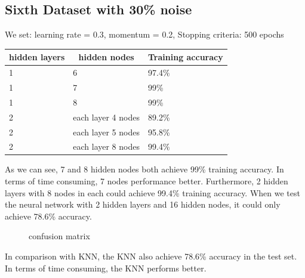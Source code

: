 \documentclass[11pt, a4paper, oneside, openright]{article}
\begin{document}
\subsection{Sixth Dataset with 30\% noise}
We set:  learning rate = 0.3, momentum = 0.2, Stopping criteria: 500 epochs
\begin{table}[H]
\begin{tabular}{|l|l|l|}
\hline
\multicolumn{1}{|c|}{\textbf{hidden layers}} & \multicolumn{1}{c|}{\textbf{hidden nodes}} 
& \multicolumn{1}{c|}{\textbf{Training accuracy}}\\
\hline
1     &6 &97.4\%                                    \\
\hline
1    &7 &99\%                                  \\
\hline
1   &8 &99\%                                             \\
\hline
2 &each layer 4 nodes  &89.2\%                                            \\
\hline
2  &each layer 5 nodes &95.8\%                                              \\
\hline
2  &each layer 8 nodes &99.4\%                                              \\
\hline
\end{tabular}
\end{table}

As we can see, 7 and 8 hidden nodes both achieve 99\% training accuracy. In terms of time consuming, 7 nodes performance better. Furthermore, 2 hidden layers with 8 nodes in each could achieve 99.4\% training accuracy.
When we test the neural network with 2 hidden layers and 16 hidden nodes, it could  only achieve 78.6\% accuracy.
  \begin{figure}[!ht]
  \centerline{}
  \caption{confusion matrix}
  \label{fig:confusion}
  \end{figure}
In comparison with KNN, the KNN also achieve 78.6\% accuracy in the test set. In terms of time consuming, the KNN performs better.
\end{document}
